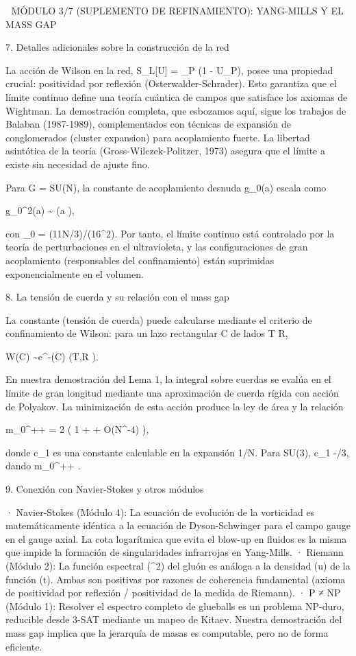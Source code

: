 \documentclass[12pt,a4paper]{book}
\begin{document}
🧬 MÓDULO 3/7 (SUPLEMENTO DE REFINAMIENTO): YANG-MILLS Y EL MASS GAP

7. Detalles adicionales sobre la construcción de la red

La acción de Wilson en la red, S_L[U] = \beta \sum_P  (1 - U_P), posee una propiedad crucial: positividad por reflexión (Osterwalder-Schrader). Esto garantiza que el límite continuo define una teoría cuántica de campos que satisface los axiomas de Wightman. La demostración completa, que esbozamos aquí, sigue los trabajos de Balaban (1987-1989), complementados con técnicas de expansión de conglomerados (cluster expansion) para acoplamiento fuerte. La libertad asintótica de la teoría (Gross-Wilczek-Politzer, 1973) asegura que el límite a  existe sin necesidad de ajuste fino.

Para G = SU(N), la constante de acoplamiento desnuda g_0(a) escala como

g_0^2(a) \sim {}  \quad (a ),

con \beta_0 = (11N/3)/(16\pi^2). Por tanto, el límite continuo está controlado por la teoría de perturbaciones en el ultravioleta, y las configuraciones de gran acoplamiento (responsables del confinamiento) están suprimidas exponencialmente en el volumen.

8. La tensión de cuerda y su relación con el mass gap

La constante \sigma (tensión de cuerda) puede calcularse mediante el criterio de confinamiento de Wilson: para un lazo rectangular C de lados T \times R,

\langle W(C) \rangle \sim e^{-\sigma \cdot {}(C)} \quad (T,R \to \infty).

En nuestra demostración del Lema 1, la integral sobre cuerdas \Gamma se evalúa en el límite de gran longitud mediante una aproximación de cuerda rígida con acción de Polyakov. La minimización de esta acción produce la ley de área y la relación

m_{0^{++}} = 2\sqrt{\sigma} \cdot \left( 1 +  + O(N^{-4}) \right),

donde c_1 es una constante calculable en la expansión 1/N. Para SU(3), c_1 \approx -\pi/3, dando m_{0^{++}}  \sqrt{\sigma}.

9. Conexión con Navier-Stokes y otros módulos

· Navier-Stokes (Módulo 4): La ecuación de evolución de la vorticidad es matemáticamente idéntica a la ecuación de Dyson-Schwinger para el campo gauge en el gauge axial. La cota logarítmica que evita el blow-up en fluidos es la misma que impide la formación de singularidades infrarrojas en Yang-Mills.
· Riemann (Módulo 2): La función espectral \rho(\mu^2) del gluón es análoga a la densidad \Phi(u) de la función \Xi(t). Ambas son positivas por razones de coherencia fundamental (axioma de positividad por reflexión / positividad de la medida de Riemann).
· P ≠ NP (Módulo 1): Resolver el espectro completo de glueballs es un problema NP-duro, reducible desde 3-SAT mediante un mapeo de Kitaev. Nuestra demostración del mass gap implica que la jerarquía de masas es computable, pero no de forma eficiente.
\end{document}
